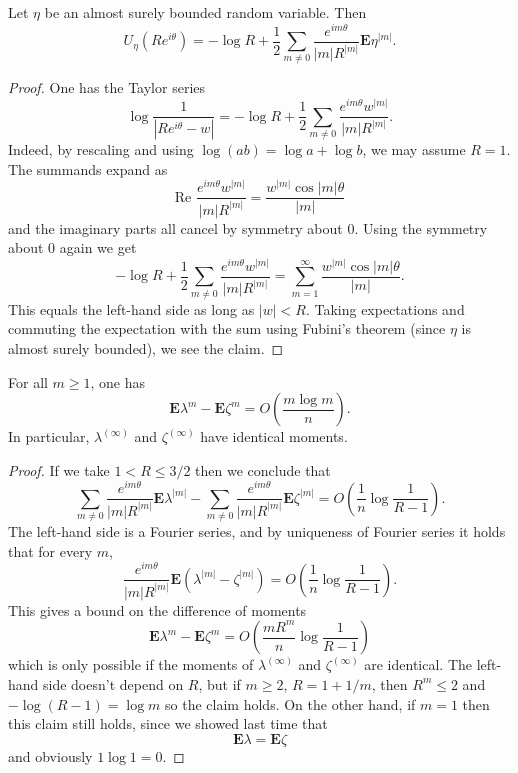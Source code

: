 \documentclass[12pt]{article}
\begin{document}
\begin{lemma}
Let $\eta$ be an almost surely bounded random variable. Then
$$U_\eta(Re^{i\theta}) = -\log R + \frac{1}{2} \sum_{m \neq 0} \frac{e^{im\theta}}{|m| R^{|m|}} \mathbf E\eta^{|m|}.$$
\end{lemma}
\begin{proof}
One has the Taylor series
$$\log \frac{1}{|Re^{i\theta} - w|} = -\log R + \frac{1}{2} \sum_{m \neq 0} \frac{e^{im\theta} w^{|m|}}{|m| R^{|m|}}.$$
Indeed, by rescaling and using $\log(ab) = \log a + \log b$, we may assume $R = 1$.
The summands expand as
$$\text{Re }\frac{e^{im\theta} w^{|m|}}{|m| R^{|m|}} = \frac{w^{|m|} \cos |m|\theta}{|m|}$$
and the imaginary parts all cancel by symmetry about $0$. Using the symmetry about $0$ again we get
$$-\log R + \frac{1}{2} \sum_{m \neq 0} \frac{e^{im\theta} w^{|m|}}{|m| R^{|m|}} = \sum_{m=1}^\infty \frac{w^{|m|} \cos |m|\theta}{|m|}.$$
This equals the left-hand side as long as $|w| < R$.
Taking expectations and commuting the expectation with the sum using Fubini's theorem (since $\eta$ is almost surely bounded), we see the claim.
\end{proof}

\begin{lemma}
For all $m \geq 1$, one has
$$\mathbf E\lambda^m - \mathbf E\zeta^m = O\left(\frac{m \log m}{n}\right).$$
In particular, $\lambda^{(\infty)}$ and $\zeta^{(\infty)}$ have identical moments.
\end{lemma}
\begin{proof}
If we take $1 < R \leq 3/2$ then we conclude that
$$\sum_{m \neq 0} \frac{e^{im\theta}}{|m| R^{|m|}} \mathbf E\lambda^{|m|} - \sum_{m \neq 0} \frac{e^{im\theta}}{|m| R^{|m|}} \mathbf E\zeta^{|m|} = O\left(\frac{1}{n} \log \frac{1}{R - 1}\right).$$
The left-hand side is a Fourier series, and by uniqueness of Fourier series it holds that for every $m$,
$$\frac{e^{im\theta}}{|m| R^{|m|}} \mathbf E(\lambda^{|m|} - \zeta^{|m|}) = O\left(\frac{1}{n} \log \frac{1}{R - 1}\right).$$
This gives a bound on the difference of moments
$$\mathbf E\lambda^m - \mathbf E\zeta^m = O\left(\frac{m R^m}{n} \log \frac{1}{R - 1}\right)$$
which is only possible if the moments of $\lambda^{(\infty)}$ and $\zeta^{(\infty)}$ are identical.
The left-hand side doesn't depend on $R$, but if $m \geq 2$, $R = 1 + 1/m$, then $R^m \leq 2$ and $-\log(R - 1) = \log m$ so the claim holds.
On the other hand, if $m = 1$ then this claim still holds, since we showed last time that
$$\mathbf E\lambda = \mathbf E\zeta$$
and obviously $1 \log 1 = 0$.
\end{proof}
\end{document}
